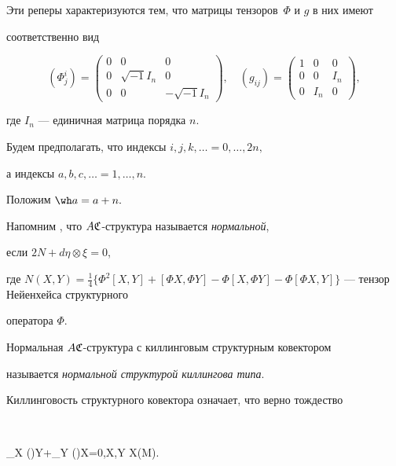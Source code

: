 Эти реперы характеризуются тем, что матрицы тензоров~$\Phi$ и $g$ в них имеют


соответственно вид


$$


(\Phi^i_j)=


\begin{pmatrix}


0 & 0 & 0\\


0 & \sqrt {-1}I_n & 0\\


0 & 0 & -\sqrt {-1}I_n


\end{pmatrix},\quad


(g_{ij})=


\begin{pmatrix}


1 & 0 & 0\\


0 & 0 & I_n\\


0 & I_n & 0


\end{pmatrix},


$$ 


где $I_n$ --- единичная матрица порядка $n$.





Будем предполагать, что индексы $i,j,k,\dotsc=0,\dotsc,2n,$ 


а индексы $a,b,c,\dotsc=1,\dotsc,n.$


Положим $\wh a=a+n.$


Напомним \cite{10}, что $A\frak C$-структура называется {\it нормальной},


если $2N+d\eta\otimes\xi=0$,


где $N(X,Y)=\frac14 \{\Phi^2[X,Y]+[\Phi X,\Phi Y]


-\Phi [X,\Phi Y]-\Phi [\Phi X,Y]\}$ --- тензор Нейенхейса структурного


оператора $\Phi$.


Нормальная $A\frak C$-структура с киллинговым структурным ковектором 


называется {\it нормальной структурой киллингова типа}.





Киллинговость структурного ковектора означает, что верно тождество


$$


\nabla_X (\eta)Y+\nabla_Y (\eta)X=0,\quad X,Y \in \frak X(M).


